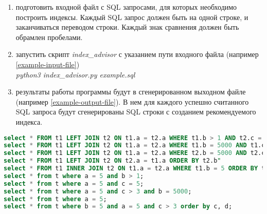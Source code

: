 \begin{enumerate}
\item подготовить входной файл с SQL запросами, для которых необходимо построить индексы. Каждый SQL запрос должен быть на одной строке, и заканчиваться переводом строки. Каждый знак сравнения должен быть обрамлен пробелами. 

\item запустить скрипт \textit{index_advisor} с указанием пути входного файла (например \ref{example-input-file})\\ \textit{python3 index_advisor.py example.sql}

\item результаты работы программы будут в сгенерированном выходном файле (например \ref{example-output-file}). В нем для каждого успешно считанного SQL запроса будут сгенерированы SQL строки с созданием рекомендуемого индекса.
\end{enumerate}


\begin{lstlisting}[language=sql, caption={Пример входного файла},label=example-input-file]
select * FROM t1 LEFT JOIN t2 ON t1.a = t2.a WHERE t1.b > 1 AND t2.c = 5;
select * FROM t1 LEFT JOIN t2 ON t1.a = t2.a WHERE t1.b = 5000 AND t1.c > 3 ORDER BY t2.c , t2.d;
select * FROM t1 LEFT JOIN t2 ON t1.a = t2.a WHERE t2.b = 5000 AND t2.c > 3 ORDER BY t2.c, t2.d;
select * FROM t1 LEFT JOIN t2 ON t2.a = t1.a ORDER BY t2.b"
select * FROM t1 INNER JOIN t2 ON t1.a = t2.a WHERE t1.b = 5 ORDER BY t1.c;
select * from t where a = 5 and b > 1;
select * from t where a = 5 and c = 5;
select * from t where a = 5 and c > 3 and b = 5000;
select * from t where a = 5;
select * from t where b = 5 and a = 5 and c > 3 order by c, d;
\end{lstlisting}

